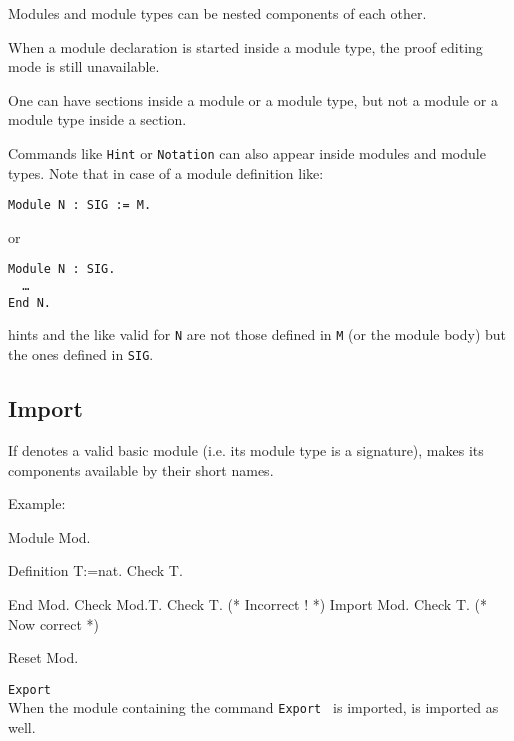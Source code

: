 \begin{Remarks}
\item Modules and module types can be nested components of each other.
\item When a module declaration is started inside a module type,
  the proof editing mode is still unavailable.
\item One can have sections inside a module or a module type, but
  not a module or a module type inside a section.
\item Commands like \texttt{Hint} or \texttt{Notation} can
  also appear inside modules and module types. Note that in case of a
  module definition like:

    \medskip
    \noindent
    {\tt Module N : SIG := M.} 
    \medskip

    or

    \medskip
    {\tt Module N : SIG.\\
      \ \ \dots\\
      End N.}
    \medskip 
    
    hints and the like valid for \texttt{N} are not those defined in
    \texttt{M} (or the module body) but the ones defined in
    \texttt{SIG}.

\end{Remarks}

\subsection{Import {\qualid}}\label{Import}
If {\qualid} denotes a valid basic module (i.e. its module type is a
signature), makes its components available by their short names.

Example:

\begin{coq_example}
Module Mod.
\end{coq_example}
\begin{coq_example}
  Definition T:=nat.
  Check T.
\end{coq_example}
\begin{coq_example}
End Mod.
Check Mod.T.
Check T. (* Incorrect ! *)
Import Mod.
Check T. (* Now correct *)
\end{coq_example}
\begin{coq_eval}
Reset Mod.
\end{coq_eval}


\begin{Variants}
\item{\tt Export {\qualid}}\\
  When the module containing the command {\tt Export {\qualid}} is
  imported, {\qualid} is imported as well.
\end{Variants}

